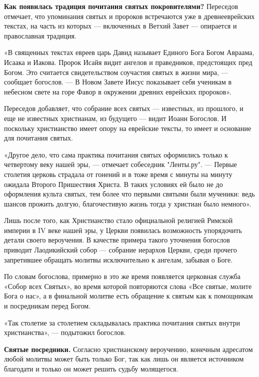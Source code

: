 \begin{framed}

    \textbf{Как появилась традиция почитания святых покровителями?} Переседов отмечает, что упоминания святых и пророков встречаются уже в древнееврейских текстах, на часть из которых — включенных в Ветхий Завет — опирается и православная традиция.

    «В священных текстах евреев царь Давид называет Единого Бога Богом Авраама, Исаака и Иакова. Пророк Исайя видит ангелов и праведников, предстоящих пред Богом. Это считается свидетельством соучастия святых в жизни мира, — сообщает богослов. — В Новом Завете Иисус показывает себя ученикам в небесном свете на горе Фавор в окружении древних еврейских пророков».

    Переседов добавляет, что собрание всех святых — известных, из прошлого, и еще не известных христианам, из будущего — видит Иоанн Богослов. И поскольку христианство имеет опору на еврейские тексты, то имеет и основание для почитания святых.

    «Другое дело, что сама практика почитания святых оформились только к четвертому веку нашей эры, — отмечает собеседник "Ленты.ру". — Первые столетия церковь страдала от гонений и в тоже время с минуты на минуту ожидала Второго Пришествия Христа. В таких условиях ей было не до оформления культа святых, тем более что первыми святыми были мученики: ведь шансов прожить долгую, благочестивую жизнь тогда у христиан было немного».

    Лишь после того, как Христианство стало официальной религией Римской империи в IV веке нашей эры, у Церкви появилась возможность упорядочить детали своего вероучения. В качестве примера такого уточнения богослов приводит Лаодикийский собор — собрание иерархов Церкви, среди прочего запретившее обращать молитвы исключительно к ангелам, забывая о Боге.

    По словам богослова, примерно в это же время появляется церковная служба «Собор всех Святых», во время которой повторяются слова «Все святые, молите Бога о нас», а в финальной молитве есть обращение к святым как к помощникам и посредникам перед Богом.

    «Так столетие за столетием складывалась практика почитания святых внутри христианства», — подытожил богослов.
\end{framed}

\textbf{Святые посредники.} Согласно христианскому вероучению, конечным адресатом любой молитвы может быть только Бог, так как лишь он является источником благодати и только он может решить судьбу молящегося.

